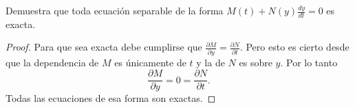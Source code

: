 Demuestra que toda ecuación separable de la forma 
\( M(t) + N(y) \frac{dy}{dt} = 0 \) es exacta.
\begin{proof}
    Para que sea exacta debe cumplirse que 
    \( \frac{\partial M}{\partial y} = \frac{\partial N}{\partial t} \). Pero esto es cierto
    desde que la dependencia de $M$ es únicamente de \( t \) y la de \( N \) es sobre \( y \).
    Por lo tanto
    \[
        \frac{\partial M}{\partial y} = 0 
        =
        \frac{\partial N}{\partial t}.
    \]
    Todas las ecuaciones de esa forma son exactas.
\end{proof}
